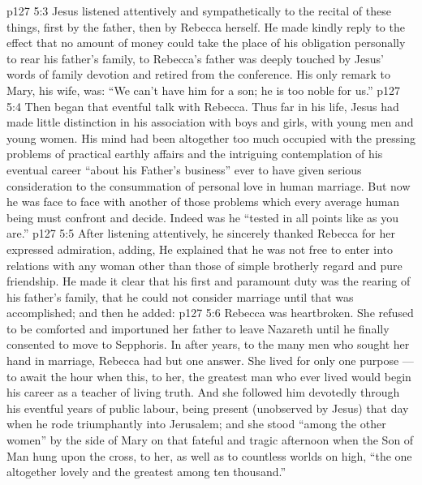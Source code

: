 \vs p127 5:3 Jesus listened attentively and sympathetically to the recital of these things, first by the father, then by Rebecca herself. He made kindly reply to the effect that no amount of money could take the place of his obligation personally to rear his father’s family, to  Rebecca’s father was deeply touched by Jesus’ words of family devotion and retired from the conference. His only remark to Mary, his wife, was: “We can’t have him for a son; he is too noble for us.”
\vs p127 5:4 Then began that eventful talk with Rebecca. Thus far in his life, Jesus had made little distinction in his association with boys and girls, with young men and young women. His mind had been altogether too much occupied with the pressing problems of practical earthly affairs and the intriguing contemplation of his eventual career “about his Father’s business” ever to have given serious consideration to the consummation of personal love in human marriage. But now he was face to face with another of those problems which every average human being must confront and decide. Indeed was he “tested in all points like as you are.”
\vs p127 5:5 After listening attentively, he sincerely thanked Rebecca for her expressed admiration, adding,  He explained that he was not free to enter into relations with any woman other than those of simple brotherly regard and pure friendship. He made it clear that his first and paramount duty was the rearing of his father’s family, that he could not consider marriage until that was accomplished; and then he added: 
\vs p127 5:6 Rebecca was heartbroken. She refused to be comforted and importuned her father to leave Nazareth until he finally consented to move to Sepphoris. In after years, to the many men who sought her hand in marriage, Rebecca had but one answer. She lived for only one purpose --- to await the hour when this, to her, the greatest man who ever lived would begin his career as a teacher of living truth. And she followed him devotedly through his eventful years of public labour, being present (unobserved by Jesus) that day when he rode triumphantly into Jerusalem; and she stood “among the other women” by the side of Mary on that fateful and tragic afternoon when the Son of Man hung upon the cross, to her, as well as to countless worlds on high, “the one altogether lovely and the greatest among ten thousand.”
